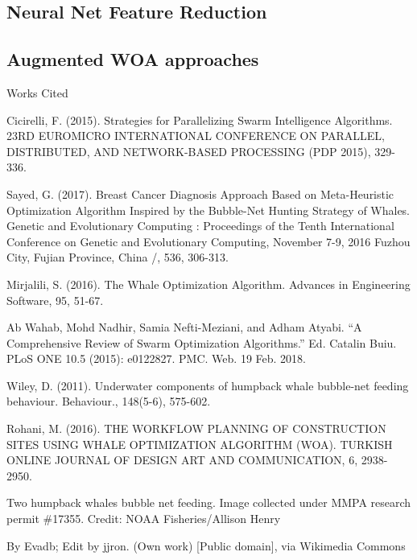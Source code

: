 \documentclass[11pt]{article}
\newcommand{\bibent}{\noindent \hangindent 40pt}
\newenvironment{workscited}{\newpage \begin{center} Works Cited \end{center}}{\newpage }
\begin{document}
\subsection*{Neural Net Feature Reduction}
\subsection*{Augmented WOA approaches}

\begin{workscited}

\bibent
Cicirelli, F. (2015). Strategies for Parallelizing Swarm Intelligence Algorithms. 23RD EUROMICRO INTERNATIONAL CONFERENCE ON PARALLEL, DISTRIBUTED, AND NETWORK-BASED PROCESSING (PDP 2015), 329-336.

\bibent
Sayed, G. (2017). Breast Cancer Diagnosis Approach Based on Meta-Heuristic Optimization Algorithm Inspired by the Bubble-Net Hunting Strategy of Whales. Genetic and Evolutionary Computing : Proceedings of the Tenth International Conference on Genetic and Evolutionary Computing, November 7-9, 2016 Fuzhou City, Fujian Province, China /, 536, 306-313.

\bibent
Mirjalili, S. (2016). The Whale Optimization Algorithm. Advances in Engineering Software, 95, 51-67.

\bibent
Ab Wahab, Mohd Nadhir, Samia Nefti-Meziani, and Adham Atyabi. “A Comprehensive Review of Swarm Optimization Algorithms.” Ed. Catalin Buiu. PLoS ONE 10.5 (2015): e0122827. PMC. Web. 19 Feb. 2018.

\bibent
Wiley, D. (2011). Underwater components of humpback whale bubble-net feeding behaviour. Behaviour., 148(5-6), 575-602.

\bibent
Rohani, M. (2016). THE WORKFLOW PLANNING OF CONSTRUCTION SITES USING WHALE OPTIMIZATION ALGORITHM (WOA). TURKISH ONLINE JOURNAL OF DESIGN ART AND COMMUNICATION, 6, 2938-2950.

\bibent %
Two humpback whales bubble net feeding. Image collected under MMPA research permit \#17355.
Credit: NOAA Fisheries/Allison Henry

\bibent %
By Evadb; Edit by jjron. (Own work) [Public domain], via Wikimedia Commons

\end{workscited}
\end{document}
